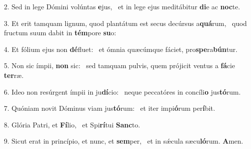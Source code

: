 2. Sed in lege Dómini volúntas \textbf{e}jus, \ast\  et in lege ejus meditábitur \textbf{di}e ac \textbf{noc}te.\

3. Et erit tamquam lignum, quod plantátum est secus decúrsus a\textbf{quá}rum, \ast\  quod fructum suum dabit in \textbf{tém}pore \textbf{su}o:\

4. Et fólium ejus non \textbf{dé}fluet: \ast\  et ómnia quæcúmque fáciet, pro\textbf{spe}ra\textbf{bún}tur.\

5. Non sic ímpii, \textbf{non} sic: \ast\  sed tamquam pulvis, quem prójicit ventus a \textbf{fá}cie \textbf{ter}ræ.\

6. Ideo non resúrgent ímpii in ju\textbf{dí}cio: \ast\  neque peccatóres in concíli\textbf{o} jus\textbf{tó}rum.\

7. Quóniam novit Dóminus viam jus\textbf{tó}rum: \ast\  et iter impi\textbf{ó}rum per\textbf{í}bit.\

8. Glória Patri, et \textbf{Fí}lio, \ast\  et Spi\textbf{rí}tui \textbf{Sanc}to.\

9. Sicut erat in princípio, et nunc, et \textbf{sem}per, \ast\  et in sǽcula sæcu\textbf{ló}rum. \textbf{A}men.\

